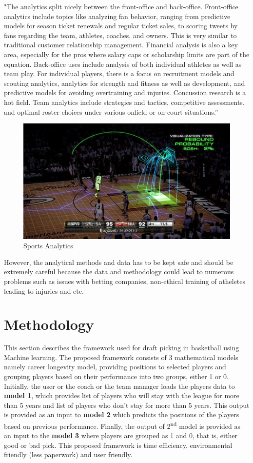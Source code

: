 \documentclass[format=sigconf]{acmart}
\begin{document}
"The analytics split nicely between the front-office and back-office. Front-office analytics
include topics like analyzing fan behavior, ranging from predictive models for season ticket
renewals and regular ticket sales, to scoring tweets by fans regarding the team, athletes,
coaches, and owners. This is very similar to traditional customer relationship management.
Financial analysis is also a key area, especially for the pros where salary caps or scholarship
limits are part of the equation. Back-office uses include analysis of both individual athletes as
well as team play. For individual players, there is a focus on recruitment models and scouting
analytics, analytics for strength and fitness as well as development, and predictive models for
avoiding overtraining and injuries. Concussion research is a hot field. Team analytics include
strategies and tactics, competitive assessments, and optimal roster choices under various onfield or on-court situations.” \cite{tichy2016changing}
\begin{figure}[H]
    \centering
    \includegraphics[scale=0.50]{sportsanalytics.jpg}
    \caption{Sports Analytics}
    \label{fig:sa}
\end{figure}
However, the analytical methods and data has to be kept safe and should be extremely careful because the data and methodology
could lead to numerous problems such as issues with betting companies, non-ethical training of atheletes leading to injuries and 
etc. \cite{spa}
\section{Methodology}
This section describes the framework used for draft picking in basketball using Machine learning. The proposed framework consists of 
3 mathematical models namely career longevity model, providing positions to selected players and grouping players based on their 
performance into two groups, either 1 or 0. Initially, the user or the coach or the team manager loads the players data to \textbf{model 1},
which provides list of players who will stay with the league for more than 5 years and list of players who don't stay for more than
5 years. This output is provided as an input to \textbf{model 2} which predicts the positions of the players based on previous 
performance. Finally, the output of 2\textsuperscript{nd} model is provided as an input to the \textbf{model 3} where players are 
grouped as 1 and 0, that is, either good or bad pick. This proposed framework is time efficiency, environmental friendly (less 
paperwork) and user friendly.
\end{document}
